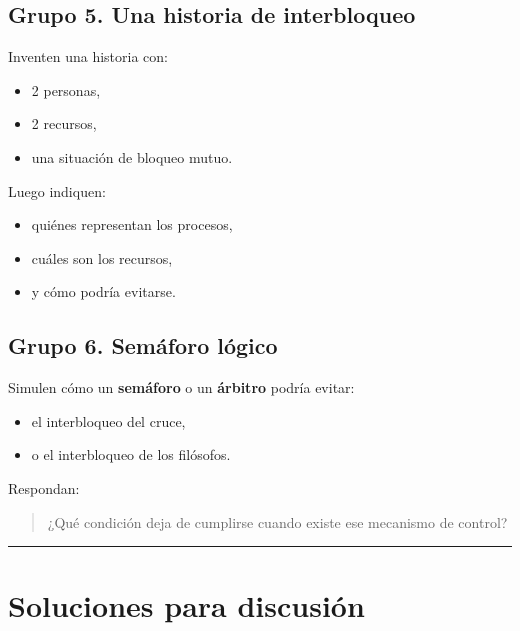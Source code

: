 \documentclass[
  spanish,
  letterpaper,
]{scrbook}
\providecommand{\tightlist}{%
  \setlength{\itemsep}{0pt}\setlength{\parskip}{0pt}}
\begin{document}
\section{Grupo 5. Una historia de
interbloqueo}\label{grupo-5.-una-historia-de-interbloqueo}

Inventen una historia con:

\begin{itemize}
\tightlist
\item
  2 personas,
\item
  2 recursos,
\item
  una situación de bloqueo mutuo.
\end{itemize}

Luego indiquen:

\begin{itemize}
\tightlist
\item
  quiénes representan los procesos,
\item
  cuáles son los recursos,
\item
  y cómo podría evitarse.
\end{itemize}

\section{Grupo 6. Semáforo lógico}\label{grupo-6.-semuxe1foro-luxf3gico}

Simulen cómo un \textbf{semáforo} o un \textbf{árbitro} podría evitar:

\begin{itemize}
\tightlist
\item
  el interbloqueo del cruce,
\item
  o el interbloqueo de los filósofos.
\end{itemize}

Respondan:

\begin{quote}
¿Qué condición deja de cumplirse cuando existe ese mecanismo de control?
\end{quote}

\begin{center}\rule{0.5\linewidth}{0.5pt}\end{center}


\chapter{Soluciones para discusión}\label{soluciones-para-discusiuxf3n}
\end{document}
